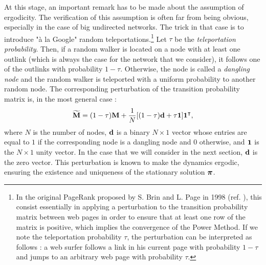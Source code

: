 At this stage, an important remark has to be made about the assumption of ergodicity. The verification of this assumption is often far from being obvious, especially in the case of big undirected networks. The trick in that case is to introduce "à la Google" random teleportations.\footnote{In the original PageRank proposed by S. Brin and L. Page in 1998 (ref. \cite{grin1998anatomy}), this consist essentially in applying a perturbation to the transition probability matrix between web pages in order to ensure that at least one row of the matrix is positive, which implies the convergence of the Power Method. If we note the teleportation probability $\tau$, the perturbation can be interpreted as follows : a web surfer follows a link in his current page with probability $1-\tau$ and jumps to an arbitrary web page with probability $\tau$.} Let $\tau$ be the \textit{teleportation probability}. Then, if a random walker is located on a node with at least one outlink (which is always the case for the network that we consider), it follows one of the outlinks with probability $1-\tau$. Otherwise, the node is called a \textit{dangling node} and the random walker is teleported with a uniform probability to another random node. The corresponding perturbation of the transition probability matrix is, in the most general case :
\begin{equation} \label{eq:M_teleport}
	\widetilde{\mathbf M} = (1-\tau)\mathbf M + \frac{1}{N}[(1-\tau)\mathbf d + \tau \mathbf 1]\mathbf 1^{\intercal},
\end{equation}
where $N$ is the number of nodes, $\mathbf d$ is a binary $N \times 1$ vector whose entries are equal to $1$ if the corresponding node is a dangling node and $0$ otherwise, and $\mathbf 1$ is the $N \times 1$ unity vector. In the case that we will consider in the next section, $\mathbf d$ is the zero vector. This perturbation is known to make the dynamics ergodic, ensuring the existence and uniqueness of the stationary solution $\boldsymbol \pi$.


